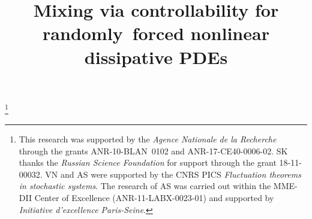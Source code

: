 \documentclass[JEP,XML,SOM,Unicode,ThmDefs]{cedram}
\theoremstyle{plain}
\numberwithin{equation}{section}
\begin{document}
\frontmatter
\title{Mixing via controllability for randomly~forced nonlinear dissipative PDEs}

\author[\initial{S.} \lastname{Kuksin}]{ }
\address{Institut de Mathématiques de Jussieu--Paris Rive Gauche, CNRS, Université Paris Diderot, UMR 7586, Sorbonne Paris Cité\\ F-75013, Paris, France\\
\& School of Mathematics, Shandong University,
Jinan, PRC\\
\& Saint Petersburg State University,
Universitetskaya nab., St. Petersburg, Russia}

\author[\initial{V.} \lastname{Nersesyan}]{ }
\address{Laboratoire de Mathématiques, UMR CNRS 8100, UVSQ, Université Paris-Saclay\\
45, av. des Etats-Unis, F-78035 Versailles, France\\
\& Centre de Recherches Mathématiques, CNRS UMI 3457, Université de Montréal\\
Montréal, QC, H3C 3J7, Canada}

\author[\initial{A.} \lastname{Shirikyan}]{ }
\address{Department of Mathematics, CY Cergy Paris Université, CNRS UMR 8088\\
2 avenue Adolphe Chauvin, 95302 Cergy--Pontoise, France\\
\& Department of Mathematics and Statistics, McGill University\\
805 Sherbrooke Street West, Montreal, QC, H3A 2K6, Canada}

\thanks{This research was supported by the \emph{Agence Nationale de la Recherche} through the grants ANR-10-BLAN~0102 and ANR-17-CE40-0006-02. SK thanks the \emph{Russian Science Foundation} for support through the grant 18-11-00032. VN and AS were supported by the CNRS PICS \emph{Fluctuation theorems in stochastic systems}. The research of AS was carried out within the MME-DII Center of Excellence (ANR-11-LABX-0023-01) and supported by \emph{Initiative d'excellence Paris-Seine}.}
\end{document}
